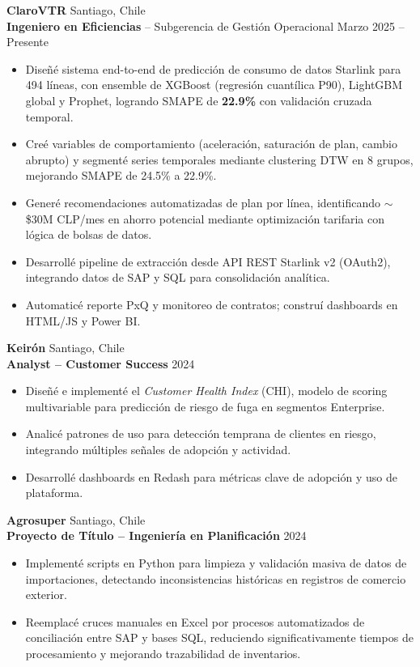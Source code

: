 \documentclass[a4paper,10pt]{article}
\newcommand{\entryspace}{\vspace{5pt}}
\begin{document}
\textbf{ClaroVTR} \hfill Santiago, Chile \\
\textbf{Ingeniero en Eficiencias} -- Subgerencia de Gestión Operacional \hfill Marzo 2025 -- Presente
\begin{itemize}
    \item Diseñé sistema end-to-end de predicción de consumo de datos Starlink para 494 líneas, con ensemble de XGBoost (regresión cuantílica P90), LightGBM global y Prophet, logrando SMAPE de \textbf{22.9\%} con validación cruzada temporal.
    \item Creé variables de comportamiento (aceleración, saturación de plan, cambio abrupto) y segmenté series temporales mediante clustering DTW en 8 grupos, mejorando SMAPE de 24.5\% a 22.9\%.
    \item Generé recomendaciones automatizadas de plan por línea, identificando $\sim$\$30M CLP/mes en ahorro potencial mediante optimización tarifaria con lógica de bolsas de datos.
    \item Desarrollé pipeline de extracción desde API REST Starlink v2 (OAuth2), integrando datos de SAP y SQL para consolidación analítica.
    \item Automaticé reporte PxQ y monitoreo de contratos; construí dashboards en HTML/JS y Power BI.
\end{itemize}

\entryspace

\textbf{Keirón} \hfill Santiago, Chile \\
\textbf{Analyst -- Customer Success} \hfill 2024
\begin{itemize}
    \item Diseñé e implementé el \textit{Customer Health Index} (CHI), modelo de scoring multivariable para predicción de riesgo de fuga en segmentos Enterprise.
    \item Analicé patrones de uso para detección temprana de clientes en riesgo, integrando múltiples señales de adopción y actividad.
    \item Desarrollé dashboards en Redash para métricas clave de adopción y uso de plataforma.
\end{itemize}

\entryspace

\textbf{Agrosuper} \hfill Santiago, Chile \\
\textbf{Proyecto de Título -- Ingeniería en Planificación} \hfill 2024
\begin{itemize}
    \item Implementé scripts en Python para limpieza y validación masiva de datos de importaciones, detectando inconsistencias históricas en registros de comercio exterior.
    \item Reemplacé cruces manuales en Excel por procesos automatizados de conciliación entre SAP y bases SQL, reduciendo significativamente tiempos de procesamiento y mejorando trazabilidad de inventarios.
\end{itemize}
\end{document}

